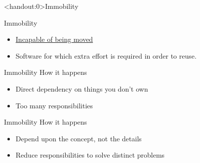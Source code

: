 \documentclass[xcolor=svgnames, handout]{beamer}
\begin{document}

{%
%
\begin{frame}<handout:0>{Immobility}
\end{frame}
}

{%
%
\begin{frame}{Immobility}

    \begin{itemize}
        \item \href{https://www.merriam-webster.com/dictionary/immobile}
            {Incapable of being moved}
        \item<2-> Software for which extra effort is required in order to reuse.
    \end{itemize}
\end{frame}
}


{%
%
\begin{frame}{Immobility}
    How it happens
    \begin{itemize}
        \item<1-> Direct dependency on things you don't own
        \item<2-> Too many responsibilities
    \end{itemize}
\end{frame}
}


{%
%
\begin{frame}{Immobility}
    How it happens
    \begin{itemize}
        \item<1-> Depend upon the concept, not the details
        \item<2-> Reduce responsibilities to solve distinct problems
    \end{itemize}
\end{frame}
}
\end{document}
